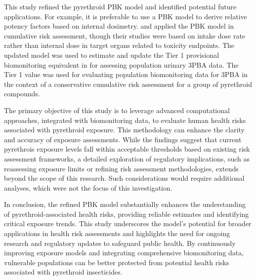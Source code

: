 \documentclass[toxics,article,submit,pdftex,moreauthors]{Definitions/mdpi}
\begin{document}
This study refined the pyrethroid PBK model and identified potential
future applications. For example, it is preferable to use a PBK model to
derive relative potency factors based on internal dosimetry.
\citet{quindroit2021estimating} and \citet{thepaut_pbpk_2024} applied
the PBK model in cumulative risk assessment, though their studies were
based on intake dose rate rather than internal dose in target organs
related to toxicity endpoints. The updated model was used to estimate
and update the Tier 1 provisional biomonitoring equivalent in
\citet{aylward_screening_level_2018} for assessing population urinary
3PBA data. The Tier 1 value was used for evaluating population
biomonitoring data for 3PBA in the context of a conservative cumulative
risk assessment for a group of pyrethroid compounds.

The primary objective of this study is to leverage advanced computational
approaches, integrated with biomonitoring data, to evaluate human health risks
associated with pyrethroid exposure. This methodology can enhance the clarity
and accuracy of exposure assessments. While the findings suggest that current
pyrethrois exposure levels fall within acceptable thresholds based on existing risk
assessment frameworks, a detailed exploration of regulatory implications, such
as reassessing exposure limits or refining risk assessment methodologies,
extends beyond the scope of this research. Such considerations would require
additional analyses, which were not the focus of this investigation.

In conclusion, the refined PBK model substantially enhances the
understanding of pyrethroid-associated health risks, providing reliable
estimates and identifying critical exposure trends. This study
underscores the model's potential for broader applications in health
risk assessments and highlights the need for ongoing research and
regulatory updates to safeguard public health. By continuously improving
exposure models and integrating comprehensive biomonitoring data, vulnerable populations can be better protected from potential health risks
associated with pyrethroid insecticides.


\vspace{6pt} 

\end{document}
